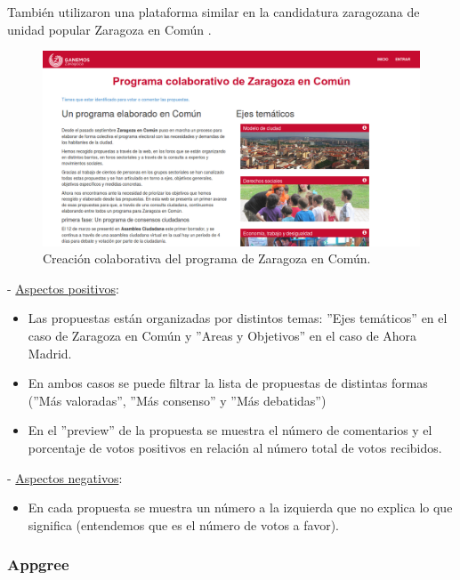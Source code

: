 También utilizaron una plataforma similar en la candidatura zaragozana de unidad popular Zaragoza en Común \cite{ref:ganemosZaragoza}.

\begin{figure}[H]
\centering
\includegraphics[keepaspectratio, scale=0.30]{Media/Captures/programaColaborativoGanemosZaragoza.png}
\caption{Creación colaborativa del programa de Zaragoza en Común.}
\label{fig:programaZaragozaEnComun}
\end{figure}

 - \underline{Aspectos positivos}:

\begin{itemize}
	\item Las propuestas están organizadas por distintos temas: ''Ejes temáticos'' en el caso de Zaragoza en Común y ''Areas y Objetivos'' en el caso de Ahora Madrid.
	\item En ambos casos se puede filtrar la lista de propuestas de distintas formas (''Más valoradas'', ''Más consenso'' y ''Más debatidas'') 
	\item En el ''preview'' de la propuesta se muestra el número de comentarios y el porcentaje de votos positivos en relación al número total de votos recibidos.
\end{itemize}

 - \underline{Aspectos negativos}:

\begin{itemize}
	\item En cada propuesta se muestra un número a la izquierda que no explica lo que significa (entendemos que es el número de votos a favor).
\end{itemize}

\subsubsection{Appgree}

